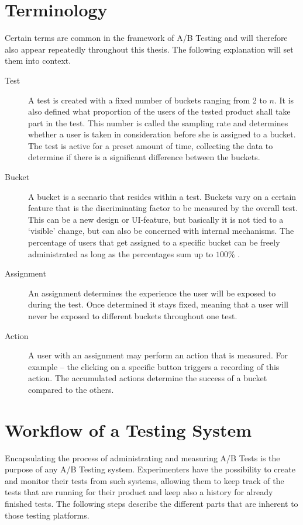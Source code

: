 \documentclass[main.tex]{subfiles}
\begin{document}
\section{Terminology}
Certain terms are common in the framework of A/B Testing and will therefore also appear repeatedly throughout this thesis. The following explanation will set them into context.
\begin{description}
\item[Test]
A test is created with a fixed number of buckets ranging from 2 to $n$. It is also defined what proportion of the users of the tested product shall take part in the test. This number is called the sampling rate and determines whether a user is taken in consideration before she is assigned to a bucket. The test is active for a preset amount of time, collecting the data to determine if there is a significant difference between the buckets.
\item[Bucket]
A bucket is a scenario that resides within a test. Buckets vary on a certain feature that is the discriminating factor to be measured by the overall test. This can be a new design or UI-feature, but basically it is not tied to a `visible' change, but can also be concerned with internal mechanisms. The percentage of users that get assigned to a specific bucket can be freely administrated as long as the percentages sum up to $100\%$ .
\item[Assignment]
An assignment determines the experience the user will be exposed to during the test. Once determined it stays fixed, meaning that a user will never be exposed to different buckets throughout one test.
\item[Action]
A user with an assignment may perform an action that is measured. For example -- the clicking on a specific button triggers a recording of this action. The accumulated actions determine the success of a bucket compared to the others. 
\end{description}
\section{Workflow of a Testing System}
Encapsulating the process of administrating and measuring A/B Tests is the purpose of any A/B Testing system. Experimenters have the possibility to create and monitor their tests from such systems, allowing them to keep track of the tests that are running for their product and keep also a history for already finished tests. The following steps describe the different parts that are inherent to those testing platforms.
\end{document}

